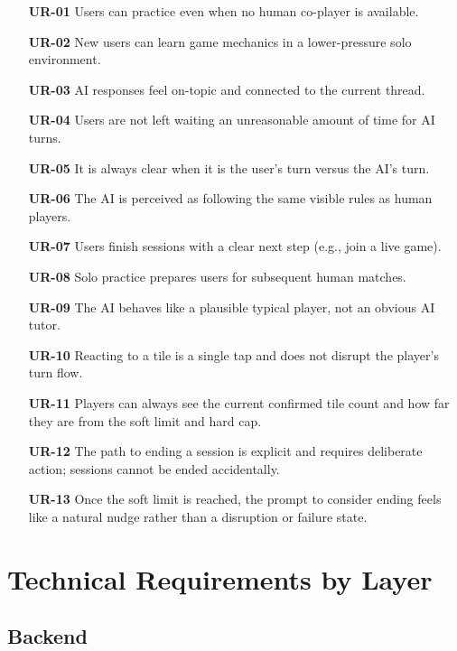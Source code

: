 \documentclass[11pt]{article}
\begin{document}
\begin{enumerate}
  \item[\textbf{UR-01}] Users can practice even when no human co-player is available.
  \item[\textbf{UR-02}] New users can learn game mechanics in a lower-pressure solo environment.
  \item[\textbf{UR-03}] AI responses feel on-topic and connected to the current thread.
  \item[\textbf{UR-04}] Users are not left waiting an unreasonable amount of time for AI turns.
  \item[\textbf{UR-05}] It is always clear when it is the user's turn versus the AI's turn.
  \item[\textbf{UR-06}] The AI is perceived as following the same visible rules as human players.
  \item[\textbf{UR-07}] Users finish sessions with a clear next step (e.g., join a live game).
  \item[\textbf{UR-08}] Solo practice prepares users for subsequent human matches.
  \item[\textbf{UR-09}] The AI behaves like a plausible typical player, not an obvious AI tutor.
  \item[\textbf{UR-10}] Reacting to a tile is a single tap and does not disrupt the player's
        turn flow.
  \item[\textbf{UR-11}] Players can always see the current confirmed tile count and how far
        they are from the soft limit and hard cap.
  \item[\textbf{UR-12}] The path to ending a session is explicit and requires deliberate action;
        sessions cannot be ended accidentally.
  \item[\textbf{UR-13}] Once the soft limit is reached, the prompt to consider ending feels
        like a natural nudge rather than a disruption or failure state.
\end{enumerate}

\section{Technical Requirements by Layer}

\subsection{Backend}
\end{document}
